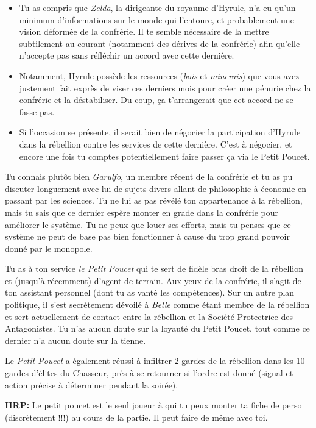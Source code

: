 {\begin{itemize}
		\item Tu as compris que \emph{Zelda}, la dirigeante du royaume d'Hyrule, n'a eu qu'un minimum d'informations sur le monde qui l'entoure, et probablement une vision déformée de la confrérie. Il te semble nécessaire de la mettre subtilement au courant (notamment des dérives de la confrérie) afin qu'elle n'accepte pas sans réfléchir un accord avec cette dernière.
		
		\item Notamment, Hyrule possède les ressources (\emph{bois} et \emph{minerais}) que vous avez justement fait exprès de viser ces derniers mois pour créer une pénurie chez la confrérie et la déstabiliser. Du coup, ça t'arrangerait que cet accord ne se fasse pas.
		
		\item Si l'occasion se présente, il serait bien de négocier la participation d'Hyrule dans la rébellion contre les services de cette dernière. C'est à négocier, et encore une fois tu comptes potentiellement faire passer ça via le Petit Poucet.
		
	\end{itemize}
	
	\par Tu connais plutôt bien \emph{Garulfo}, un membre récent de la confrérie et tu as pu discuter longuement avec lui de sujets divers allant de philosophie à économie en passant par les sciences. Tu ne lui as pas révélé ton appartenance à la rébellion, mais tu sais que ce dernier espère monter en grade dans la confrérie pour améliorer le système. Tu ne peux que louer ses efforts, mais tu penses que ce système ne peut de base pas bien fonctionner à cause du trop grand pouvoir donné par le monopole.
	
	\par Tu as à ton service \emph{le Petit Poucet} qui te sert de fidèle bras droit de la rébellion et (jusqu'à récemment) d'agent de terrain. Aux yeux de la confrérie, il s'agit de ton assistant personnel (dont tu as vanté les compétences). Sur un autre plan politique, il s'est secrètement dévoilé à \emph{Belle} comme étant membre de la rébellion et sert actuellement de contact entre la rébellion et la Société Protectrice des Antagonistes. Tu n'as aucun doute sur la loyauté du Petit Poucet, tout comme ce dernier n'a aucun doute sur la tienne.
	
	\par Le \emph{Petit Poucet} a également réussi à infiltrer 2 gardes de la rébellion dans les 10 gardes d'élites du Chasseur, près à se retourner si l'ordre est donné (signal et action précise à déterminer pendant la soirée).
	
	\par \textbf{HRP:} Le petit poucet est le seul joueur à qui tu peux monter ta fiche de perso (discrètement !!!) au cours de la partie. Il peut faire de même avec toi.
}


